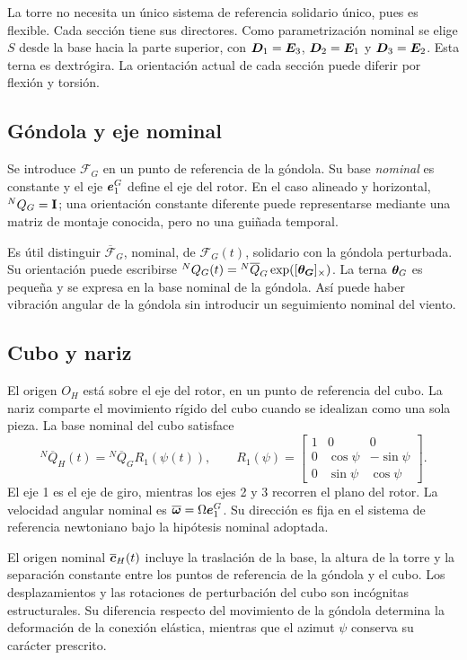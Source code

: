 La torre no necesita un único sistema de referencia solidario único, pues es flexible. Cada sección tiene sus directores. Como parametrización nominal se elige $S$ desde la base hacia la parte superior, con $\bm{D}_1=\bm{E}_3$, $\bm{D}_2=\bm{E}_1$ y $\bm{D}_3=\bm{E}_2$. Esta terna es dextrógira. La orientación actual de cada sección puede diferir por flexión y torsión.

\subsection{Góndola y eje nominal}
Se introduce $\mathcal F_G$ en un punto de referencia de la góndola. Su base \emph{nominal} es constante y el eje $\bm{e}_1^G$ define el eje del rotor. En el caso alineado y horizontal, ${}^NQ_G=\mathbf I$; una orientación constante diferente puede representarse mediante una matriz de montaje conocida, pero no una guiñada temporal.

Es útil distinguir $\overline{\mathcal F}_G$, nominal, de $\mathcal F_G(t)$, solidario con la góndola perturbada. Su orientación puede escribirse ${}^NQ_G(t)={}^N\overline Q_G\exp([\bm{\theta_G}]_{\times})$. La terna $\bm{\theta}_G$ es pequeña y se expresa en la base nominal de la góndola. Así puede haber vibración angular de la góndola sin introducir un seguimiento nominal del viento.

\subsection{Cubo y nariz}
El origen $O_H$ está sobre el eje del rotor, en un punto de referencia del cubo. La nariz comparte el movimiento rígido del cubo cuando se idealizan como una sola pieza. La base nominal del cubo satisface
\begin{equation}
 {}^N\overline Q_H(t)={}^N\overline Q_G R_1(\psi(t)),\qquad
 R_1(\psi)=\begin{bmatrix}1&0&0\\0&\cos\psi&-\sin\psi\\0&\sin\psi&\cos\psi\end{bmatrix}.
\end{equation}
El eje 1 es el eje de giro, mientras los ejes 2 y 3 recorren el plano del rotor. La velocidad angular nominal es $\overline{\bm{\omega}}=\Omega\bm{e}_1^G$. Su dirección es fija en el sistema de referencia newtoniano bajo la hipótesis nominal adoptada.

El origen nominal $\overline{\bm{c}}_H(t)$ incluye la traslación de la base, la altura de la torre y la separación constante entre los puntos de referencia de la góndola y el cubo. Los desplazamientos y las rotaciones de perturbación del cubo son incógnitas estructurales. Su diferencia respecto del movimiento de la góndola determina la deformación de la conexión elástica, mientras que el azimut $\psi$ conserva su carácter prescrito.

